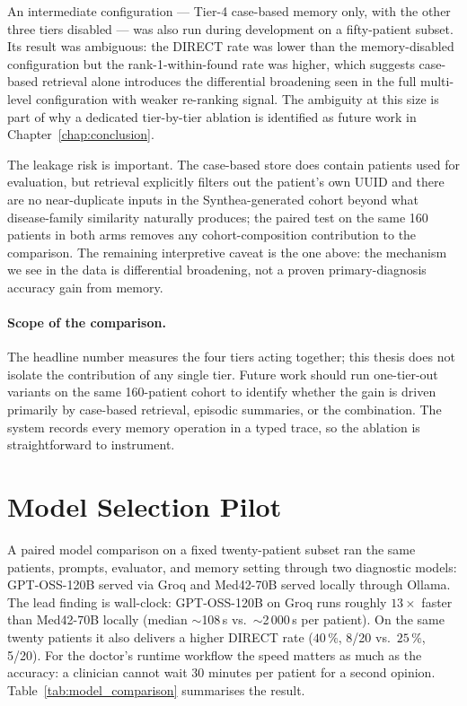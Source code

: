 An intermediate configuration --- Tier-4 case-based memory only,
with the other three tiers disabled --- was also run during
development on a fifty-patient subset. Its result was ambiguous: the
DIRECT rate was lower than the memory-disabled configuration but the
rank-1-within-found rate was higher, which suggests case-based
retrieval alone introduces the differential broadening seen in the
full multi-level configuration with weaker re-ranking signal. The
ambiguity at this size is part of why a dedicated tier-by-tier
ablation is identified as future work in
Chapter~\ref{chap:conclusion}.

The leakage risk is important. The case-based store does contain
patients used for evaluation, but retrieval explicitly filters out
the patient's own UUID and there are no near-duplicate inputs in the
Synthea-generated cohort beyond what disease-family similarity
naturally produces; the paired test on the same 160 patients in
both arms removes any cohort-composition contribution to the
comparison. The remaining interpretive caveat is the one above: the
mechanism we see in the data is differential broadening, not a
proven primary-diagnosis accuracy gain from memory.

\paragraph{Scope of the comparison.}
The headline number measures the four tiers acting together; this
thesis does not isolate the contribution of any single tier. Future
work should run one-tier-out variants on the same 160-patient cohort
to identify whether the gain is driven primarily by case-based
retrieval, episodic summaries, or the combination. The system records
every memory operation in a typed trace, so the ablation is
straightforward to instrument.

\section{Model Selection Pilot}
\label{sec:results_models}

A paired model comparison on a fixed twenty-patient subset ran the
same patients, prompts, evaluator, and memory setting through two
diagnostic models: GPT-OSS-120B served via Groq and Med42-70B served
locally through Ollama. The lead finding is wall-clock: GPT-OSS-120B
on Groq runs roughly $13\times$ faster than Med42-70B locally
(median $\sim$108\,s vs.\ $\sim$2\,000\,s per patient). On the same
twenty patients it also delivers a higher DIRECT rate
($40\,\%$, 8/20 vs.\ $25\,\%$, 5/20). For the doctor's runtime
workflow the speed matters as much as the accuracy: a clinician
cannot wait 30 minutes per patient for a second opinion.
Table~\ref{tab:model_comparison} summarises the result.

